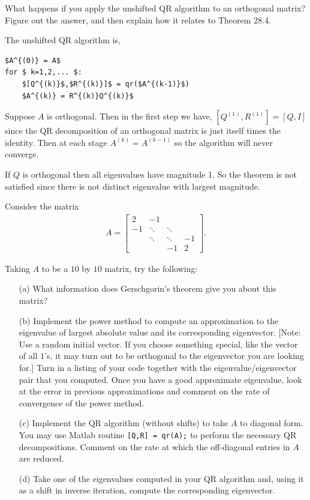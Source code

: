 \documentclass[10pt]{article}
\begin{document}
\begin{problem}[Exercise 28.1]
What happens if you apply the unshifted QR algorithm to an orthogonal matrix? Figure out the answer, and then explain how it relates to Theorem 28.4.
\end{problem}

\begin{solution}[Solution]
The unshifted QR algorithm is,
\begin{lstlisting}[mathescape=true]
$A^{(0)} = A$
for $ k=1,2,... $:
    $[Q^{(k)}$,$R^{(k)}]$ = qr($A^{(k-1)}$)
    $A^{(k)} = R^{(k)}Q^{(k)}$
\end{lstlisting}

Suppose \( A \) is orthogonal. Then in the first step we have, \( [Q^{(1)},R^{(1)}] = [Q,I] \) since the QR decomposition of an orthogonal matrix is just itself times the identity. Then at each stage \( A^{(k)} = A^{(k-1)} \) so the algorithm will never converge.

If \( Q \) is orthogonal then all eigenvalues have magnitude 1. So the theorem is not satisfied since there is not distinct eigenvalue with largest magnitude.
\end{solution}

\begin{problem}[Exercise 4]
Consider the matrix
\begin{align*}
    A = \left[ \begin{array}{cccc} 2 & -1 & & \\ -1 & \ddots & \ddots & \\
 & \ddots & \ddots & -1 \\ & & -1 & 2 \end{array} \right] .
\end{align*}

    Taking \(A\) to be a \(10\) by \(10\) matrix, try the following:
\begin{enumerate}
    \item[(a)] What information does Gerschgorin's theorem give you about this matrix?
    \item[(b)] Implement the power method to compute an approximation to the eigenvalue of largest absolute value and its corresponding eigenvector.  [Note:  Use a random initial vector.  If you choose something special, like the vector of all \(1\)'s, it may turn out to be orthogonal to the eigenvector you are looking for.] Turn in a listing of your code together with the eigenvalue/eigenvector pair that you computed.  Once you have a good approximate eigenvalue, look at the error in previous approximations and comment on the rate of convergence of the power method.
    \item[(c)] Implement the QR algorithm (without shifts) to take \(A\) to diagonal form. You may use Matlab routine \verb+[Q,R] = qr(A);+ to perform the necessary QR decompositions.  Comment on the rate at which the off-diagonal entries in \(A\) are reduced.
    \item[(d)] Take one of the eigenvalues computed in your QR algorithm and, using it as a shift in inverse iteration, compute the corresponding eigenvector.
\end{enumerate}

\end{problem}
\end{document}
